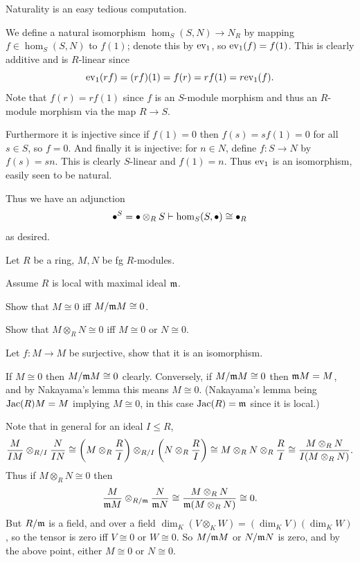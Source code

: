     Naturality is an easy tedious computation.

    \item We define a natural isomorphism $\hom_S(S,N)\to N_R$ by mapping $f\in\hom_S(S,N)$ to $f(1)$; denote this by ${\rm ev}_1$, so ${\rm ev}_1(f)=f(1)$.
    This is clearly additive and is $R$-linear since
    $$ {\rm ev}_1(rf) = (rf)(1) = f(r) = rf(1) = r{\rm ev}_1(f) . $$
    Note that $f(r)=rf(1)$ since $f$ is an $S$-module morphism and thus an $R$-module morphism via the map $R\to S$.

    Furthermore it is injective since if $f(1)=0$ then $f(s)=sf(1)=0$ for all $s\in S$, so $f=0$.
    And finally it is injective: for $n\in N$, define $f\colon S\to N$ by $f(s)=sn$.
    This is clearly $S$-linear and $f(1)=n$.
    Thus ${\rm ev}_1$ is an isomorphism, easily seen to be natural.

    Thus we have an adjunction
    $$ \bullet^S = \bullet\otimes_RS \vdash \hom_S(S,\bullet) \cong \bullet_R $$
    as desired.
\eenum

\bprob

    Let $R$ be a ring, $M,N$ be fg $R$-modules.
    \benum
        \item Assume $R$ is local with maximal ideal ${{\frak m}}$.
        \benum
            \item Show that $M\cong0$ iff $M/{{\frak m}} M\cong0$.
            \item Show that $M\otimes_RN\cong0$ iff $M\cong0$ or $N\cong0$.
        \eenum
        \item Let $f\colon M\to M$ be surjective, show that it is an isomorphism.
    \eenum

\eprob

\benum
    \item
    \benum
        \item If $M\cong0$ then $M/{{\frak m}} M\cong0$ clearly.
        Conversely, if $M/{{\frak m}} M\cong0$ then ${{\frak m}} M=M$, and by Nakayama's lemma this means $M\cong0$.
        (Nakayama's lemma being ${\rm Jac}(R)M=M$ implying $M\cong0$, in this case ${\rm Jac}(R)={{\frak m}}$ since it is local.)

        \item Note that in general for an ideal $I\leq R$,
        $$ {{M}\over{IM}} \otimes_{R/I} {{N}\over{IN}} \cong \mathopen{}\mathclose{\left(M\otimes_R{{R}\over{I}}\right)} \otimes_{R/I} \mathopen{}\mathclose{\left(N\otimes_R{{R}\over{I}}\right)}
        \cong M\otimes_R N\otimes_R{{R}\over{I}} \cong {{M\otimes_RN}\over{I(M\otimes_RN)}} . $$
        Thus if $M\otimes_RN\cong0$ then
        $$ {{M}\over{{{\frak m}}M}}\otimes_{R/{{\frak m}}} {{N}\over{{{\frak m}}N}} \cong {{M\otimes_RN}\over{{{\frak m}}(M\otimes_RN)}} \cong 0 . $$
        But $R/{{\frak m}}$ is a field, and over a field $\dim_K(V\otimes_KW)=(\dim_KV)(\dim_KW)$, so the tensor is zero iff $V\cong0$ or $W\cong0$.
        So $M/{{\frak m}} M$ or $N/{{\frak m}} N$ is zero, and by the above point, either $M\cong0$ or $N\cong0$.

